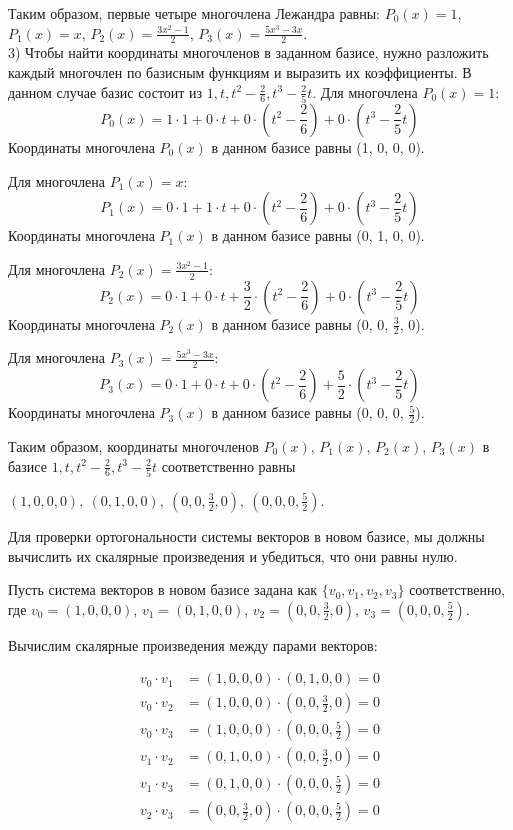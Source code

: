 \documentclass{article}
\begin{document}
Таким образом, первые четыре многочлена Лежандра равны: \(P_0(x) = 1\), \(P_1(x) = x\), \(P_2(x) = \frac{{3x^2 - 1}}{{2}}\), \(P_3(x) = \frac{{5x^3 - 3x}}{{2}}\).\\


3) Чтобы найти координаты многочленов в заданном базисе, нужно разложить каждый многочлен по базисным функциям и выразить их коэффициенты. В данном случае базис состоит из ${1, t, t^2-\frac{2}{6}, t^3-\frac{2}{5}t}$.
Для многочлена \(P_0(x) = 1\):
\[P_0(x) = 1 \cdot 1 + 0 \cdot t + 0 \cdot \left(t^2-\frac{2}{6}\right) + 0 \cdot \left(t^3-\frac{2}{5}t\right)\]
Координаты многочлена \(P_0(x)\) в данном базисе равны (1, 0, 0, 0).

Для многочлена \(P_1(x) = x\):
\[P_1(x) = 0 \cdot 1 + 1 \cdot t + 0 \cdot \left(t^2-\frac{2}{6}\right) + 0 \cdot \left(t^3-\frac{2}{5}t\right)\]
Координаты многочлена \(P_1(x)\) в данном базисе равны (0, 1, 0, 0).

Для многочлена \(P_2(x) = \frac{{3x^2 - 1}}{{2}}\):
\[P_2(x) = 0 \cdot 1 + 0 \cdot t + \frac{3}{2} \cdot \left(t^2-\frac{2}{6}\right) + 0 \cdot \left(t^3-\frac{2}{5}t\right)\]
Координаты многочлена \(P_2(x)\) в данном базисе равны (0, 0, \(\frac{3}{2}\), 0).

Для многочлена \(P_3(x) = \frac{{5x^3 - 3x}}{{2}}\):
\[P_3(x) = 0 \cdot 1 + 0 \cdot t + 0 \cdot \left(t^2-\frac{2}{6}\right) + \frac{5}{2} \cdot \left(t^3-\frac{2}{5}t\right)\]
Координаты многочлена \(P_3(x)\) в данном базисе равны (0, 0, 0, \(\frac{5}{2}\)).

Таким образом, координаты многочленов \(P_0(x)\), \(P_1(x)\), \(P_2(x)\), \(P_3(x)\) в базисе ${1, t, t^2-\frac{2}{6}, t^3-\frac{2}{5}t}$ соответственно равны 
\begin{center}
    $(1, 0, 0, 0),\ (0, 1, 0, 0),\ (0, 0, \frac{3}{2}, 0),\ (0, 0, 0, \frac{5}{2})$.
\end{center}


Для проверки ортогональности системы векторов в новом базисе, мы должны вычислить их скалярные произведения и убедиться, что они равны нулю.

Пусть система векторов в новом базисе задана как \(\{v_0, v_1, v_2, v_3\}\) соответственно, где
\(v_0 = (1, 0, 0, 0)\),
\(v_1 = (0, 1, 0, 0)\),
\(v_2 = (0, 0, \frac{3}{2}, 0)\),
\(v_3 = (0, 0, 0, \frac{5}{2})\).

Вычислим скалярные произведения между парами векторов:


\begin{align*}
v_0 \cdot v_1 &= (1, 0, 0, 0) \cdot (0, 1, 0, 0) = 0 \\
v_0 \cdot v_2 &= (1, 0, 0, 0) \cdot (0, 0, \frac{3}{2}, 0) = 0 \\
v_0 \cdot v_3 &= (1, 0, 0, 0) \cdot (0, 0, 0, \frac{5}{2}) = 0 \\
v_1 \cdot v_2 &= (0, 1, 0, 0) \cdot (0, 0, \frac{3}{2}, 0) = 0 \\
v_1 \cdot v_3 &= (0, 1, 0, 0) \cdot (0, 0, 0, \frac{5}{2}) = 0 \\
v_2 \cdot v_3 &= (0, 0, \frac{3}{2}, 0) \cdot (0, 0, 0, \frac{5}{2}) = 0 \\
\end{align*}
\end{document}
